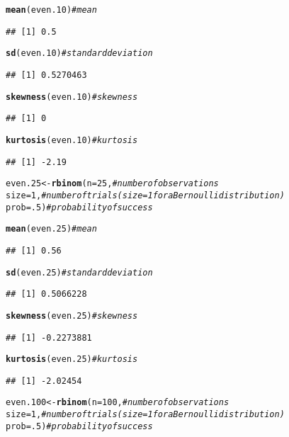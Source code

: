 \documentclass{article}\usepackage[]{graphicx}\usepackage[]{color}
\makeatletter
\newcommand{\hlnum}[1]{\textcolor[rgb]{0.686,0.059,0.569}{#1}}%
\newcommand{\hlcom}[1]{\textcolor[rgb]{0.678,0.584,0.686}{\textit{#1}}}%
\newcommand{\hlstd}[1]{\textcolor[rgb]{0.345,0.345,0.345}{#1}}%
\newcommand{\hlkwb}[1]{\textcolor[rgb]{0.69,0.353,0.396}{#1}}%
\newcommand{\hlkwc}[1]{\textcolor[rgb]{0.333,0.667,0.333}{#1}}%
\newcommand{\hlkwd}[1]{\textcolor[rgb]{0.737,0.353,0.396}{\textbf{#1}}}%
\newenvironment{kframe}{%
 \def\at@end@of@kframe{}%
 \ifinner\ifhmode%
  \def\at@end@of@kframe{\end{minipage}}%
  \begin{minipage}{\columnwidth}%
 \fi\fi%
 \def\FrameCommand##1{\hskip\@totalleftmargin \hskip-\fboxsep
 \colorbox{shadecolor}{##1}\hskip-\fboxsep
     \hskip-\linewidth \hskip-\@totalleftmargin \hskip\columnwidth}%
 \MakeFramed {\advance\hsize-\width
   \@totalleftmargin\z@ \linewidth\hsize
   \@setminipage}}%
 {\par\unskip\endMakeFramed%
 \at@end@of@kframe}
\newenvironment{knitrout}{}{} %
\makeatother
\begin{document}
\begin{enumerate}
\begin{enumerate}
\begin{knitrout}
\begin{kframe}
\begin{alltt}
\hlkwd{mean}\hlstd{(even.10)}                    \hlcom{#mean}
\end{alltt}
\begin{verbatim}
## [1] 0.5
\end{verbatim}
\begin{alltt}
\hlkwd{sd}\hlstd{(even.10)}                      \hlcom{#standard deviation}
\end{alltt}
\begin{verbatim}
## [1] 0.5270463
\end{verbatim}
\begin{alltt}
\hlkwd{skewness}\hlstd{(even.10)}                \hlcom{#skewness}
\end{alltt}
\begin{verbatim}
## [1] 0
\end{verbatim}
\begin{alltt}
\hlkwd{kurtosis}\hlstd{(even.10)}                \hlcom{#kurtosis}
\end{alltt}
\begin{verbatim}
## [1] -2.19
\end{verbatim}
\begin{alltt}
\hlstd{even.25}  \hlkwb{<-} \hlkwd{rbinom}\hlstd{(}\hlkwc{n}\hlstd{=}\hlnum{25}\hlstd{,}         \hlcom{#number of observations}
              \hlkwc{size}\hlstd{=}\hlnum{1}\hlstd{,}            \hlcom{#number of trials (size=1 for a Bernoulli distribution)}
              \hlkwc{prob}\hlstd{=}\hlnum{.5}\hlstd{)}           \hlcom{#probability of success}

\hlkwd{mean}\hlstd{(even.25)}                    \hlcom{#mean}
\end{alltt}
\begin{verbatim}
## [1] 0.56
\end{verbatim}
\begin{alltt}
\hlkwd{sd}\hlstd{(even.25)}                      \hlcom{#standard deviation}
\end{alltt}
\begin{verbatim}
## [1] 0.5066228
\end{verbatim}
\begin{alltt}
\hlkwd{skewness}\hlstd{(even.25)}                \hlcom{#skewness}
\end{alltt}
\begin{verbatim}
## [1] -0.2273881
\end{verbatim}
\begin{alltt}
\hlkwd{kurtosis}\hlstd{(even.25)}                \hlcom{#kurtosis}
\end{alltt}
\begin{verbatim}
## [1] -2.02454
\end{verbatim}
\begin{alltt}
\hlstd{even.100} \hlkwb{<-} \hlkwd{rbinom}\hlstd{(}\hlkwc{n}\hlstd{=}\hlnum{100}\hlstd{,}        \hlcom{#number of observations}
              \hlkwc{size}\hlstd{=}\hlnum{1}\hlstd{,}            \hlcom{#number of trials (size=1 for a Bernoulli distribution)}
              \hlkwc{prob}\hlstd{=}\hlnum{.5}\hlstd{)}           \hlcom{#probability of success}


\end{alltt}
\end{kframe}
\end{knitrout}
\end{enumerate}
\end{enumerate}
\end{document}
